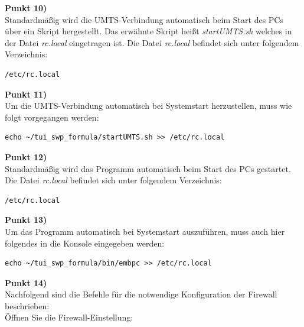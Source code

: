 \documentclass[fontsize = 12pt, paper = a4]{scrreprt}
\begin{document}
\textbf{Punkt 10)} \\

Standardmäßig wird die UMTS-Verbindung automatisch beim Start des PCs über ein Skript hergestellt. Das erwähnte Skript heißt \textit{startUMTS.sh} welches in der Datei  \textit{rc.local } eingetragen ist. Die Datei \textit{rc.local} befindet sich unter folgendem Verzeichnis:

\vspace*{4mm}
\begin{lstlisting}[frame=single]
/etc/rc.local
\end{lstlisting} 
\vspace*{-2mm}

\textbf{Punkt 11)} \\

Um die UMTS-Verbindung automatisch bei Systemstart herzustellen, muss wie folgt vorgegangen werden:

\vspace*{4mm}
\begin{lstlisting}[frame=single]
echo ~/tui_swp_formula/startUMTS.sh >> /etc/rc.local
\end{lstlisting} 
\vspace*{-2mm}

\textbf{Punkt 12)} \\

Standardmäßig wird das Programm automatisch beim Start des PCs gestartet. Die Datei \textit{rc.local} befindet sich unter folgendem Verzeichnis:

\vspace*{4mm}
\begin{lstlisting}[frame=single]
/etc/rc.local
\end{lstlisting} 
\vspace*{-2mm}

\textbf{Punkt 13)} \\

Um das Programm automatisch bei Systemstart auszuführen, muss auch hier folgendes in die Konsole eingegeben werden:

\vspace*{4mm}
\begin{lstlisting}[frame=single]
echo ~/tui_swp_formula/bin/embpc >> /etc/rc.local
\end{lstlisting} 
\vspace*{-2mm}

\textbf{Punkt 14)} \\

Nachfolgend sind die Befehle für die notwendige Konfiguration der Firewall beschrieben: \\
Öffnen Sie die Firewall-Einstellung:
\end{document}

